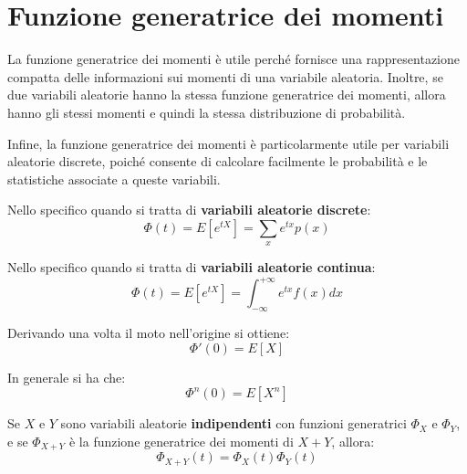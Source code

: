 \chapter{Funzione generatrice dei momenti}

La funzione generatrice dei momenti è utile perché fornisce una rappresentazione compatta delle informazioni sui momenti di una variabile aleatoria. Inoltre, se due variabili aleatorie hanno la stessa funzione generatrice dei momenti, allora hanno gli stessi momenti e quindi la stessa distribuzione di probabilità.

Infine, la funzione generatrice dei momenti è particolarmente utile per variabili aleatorie discrete, poiché consente di calcolare facilmente le probabilità e le statistiche associate a queste variabili.

Nello specifico quando si tratta di \textbf{variabili aleatorie discrete}:
\begin{equation}
  \Phi(t) = E[e^{tX}] = \sum_x e^{tx}p(x)
\end{equation}

Nello specifico quando si tratta di \textbf{variabili aleatorie continua}:
\begin{equation}
  \Phi(t) = E[e^{tX}] = \int_{-\infty}^{+\infty} e^{tx} f(x)dx
\end{equation}

Derivando una volta il moto nell'origine si ottiene:
\begin{equation}
  \Phi'(0) = E[X]
\end{equation}

In generale si ha che:
\begin{equation}
  \Phi^n(0) = E[X^n]
\end{equation}

Se $X$ e $Y$ sono variabili aleatorie \textbf{indipendenti} con funzioni generatrici 
$\Phi_X$ e $\Phi_Y$, e se $\Phi_{X+Y}$ è la funzione generatrice dei momenti di $X+Y$, allora:
\begin{equation}
  \Phi_{X+Y}(t) = \Phi_X(t)\Phi_Y(t)
\end{equation}


